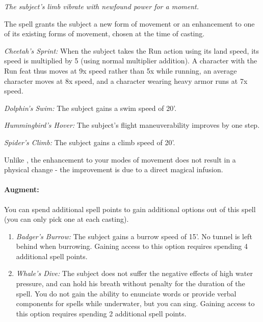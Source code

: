 \emph{The subject's limb vibrate with newfound power for a moment.}

The spell grants the subject a new form of movement or an enhancement to one of its existing forms of movement, chosen at the time of casting.

\begin{list}{}{\leftmargin=1em}   
\item \emph{Cheetah's Sprint:} When the subject takes the Run action using its land speed, its 
 speed is multiplied by 5 (using normal multiplier addition). A character with the Run feat thus
 moves at 9x speed rather than 5x while running, an average character moves at 8x speed, and a
 character wearing heavy armor runs at 7x speed.
 \item \emph{Dolphin's Swim:} The subject gains a swim speed of 20'.
 \item \emph{Hummingbird's Hover:} The subject's flight maneuverability improves by one step.
 \item \emph{Spider's Climb:} The subject gains a climb speed of 20'. %
\end{list}

Unlike , the enhancement to your modes of movement does not result in a physical change - the improvement is due to a direct magical infusion.

\paragraph{Augment:} You can spend additional spell points to gain additional options out of this spell
(you can only pick one at each casting).
\begin{enumerate}
 \item \emph{Badger's Burrow:} The subject gains a burrow speed of 15'. 
 No tunnel is left behind when burrowing.
 Gaining access to this option requires spending 4 additional spell points.
 \item \emph{Whale's Dive:} The subject does not suffer the negative effects of high water pressure, 
 and can hold his breath without penalty for the duration of the spell.
 You do not gain the ability to enunciate words or provide verbal components for spells while underwater, but you can sing.
 Gaining access to this option requires spending 2 additional spell points.
\end{enumerate}

